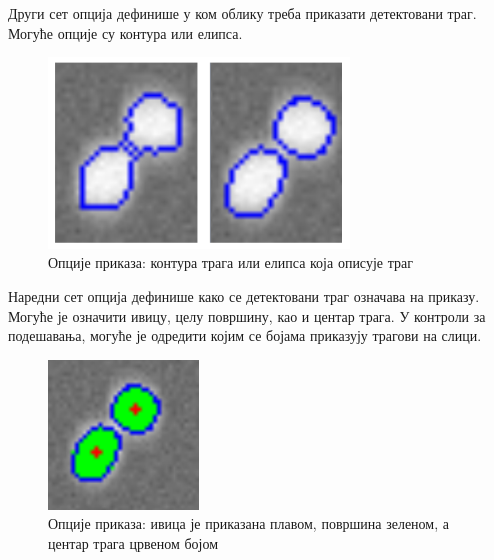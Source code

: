 \documentclass[11pt,a4paper,serbian,oneside]{book}
\begin{document}
Други сет опција дефинише у ком облику треба приказати детектовани траг. Могуће опције су контура или елипса.

\begin{figure}[H]
\begin{center}
\includegraphics[width=80mm]{images/shapetype.png}
\end{center}
\caption{Опције приказа: контура трага или елипса која описује траг}
\label{fig:shapetype}
\end{figure}

Наредни сет опција дефинише како се детектовани траг означава на приказу. Могуће је означити ивицу, целу површину, као и центар трага. У контроли за подешавања, могуће је одредити којим се бојама приказују трагови на слици.

\begin{figure}[H]
\begin{center}
\includegraphics[width=40mm]{images/trace.png}
\end{center}
\caption{Опције приказа: ивица је приказана плавом, површина зеленом, а центар трага црвеном бојом}
\label{fig:trace}
\end{figure}
\end{document}
